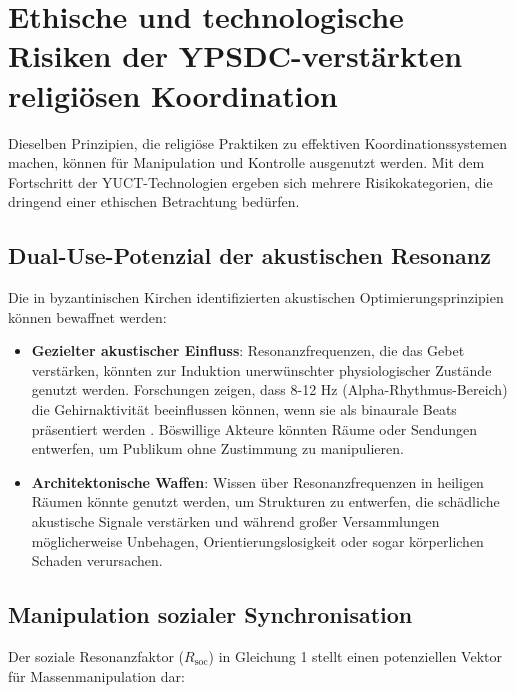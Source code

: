 \documentclass[12pt,a4paper]{article}
\begin{document}
	\section{Ethische und technologische Risiken der YPSDC-verstärkten religiösen Koordination}
	\label{sec:risks}
	
	Dieselben Prinzipien, die religiöse Praktiken zu effektiven Koordinationssystemen machen, können für Manipulation und Kontrolle ausgenutzt werden. Mit dem Fortschritt der YUCT-Technologien ergeben sich mehrere Risikokategorien, die dringend einer ethischen Betrachtung bedürfen.
	
	\subsection{Dual-Use-Potenzial der akustischen Resonanz}
	
	Die in byzantinischen Kirchen identifizierten akustischen Optimierungsprinzipien können bewaffnet werden:
	
	\begin{itemize}
		\item \textbf{Gezielter akustischer Einfluss}: Resonanzfrequenzen, die das Gebet verstärken, könnten zur Induktion unerwünschter physiologischer Zustände genutzt werden. Forschungen zeigen, dass 8-12 Hz (Alpha-Rhythmus-Bereich) die Gehirnaktivität beeinflussen können, wenn sie als binaurale Beats präsentiert werden \cite{Garcia2021}. Böswillige Akteure könnten Räume oder Sendungen entwerfen, um Publikum ohne Zustimmung zu manipulieren.
		
		\item \textbf{Architektonische Waffen}: Wissen über Resonanzfrequenzen in heiligen Räumen könnte genutzt werden, um Strukturen zu entwerfen, die schädliche akustische Signale verstärken und während großer Versammlungen möglicherweise Unbehagen, Orientierungslosigkeit oder sogar körperlichen Schaden verursachen.
	\end{itemize}
	
	\subsection{Manipulation sozialer Synchronisation}
	
	Der soziale Resonanzfaktor ($R_{\mathrm{soc}}$) in Gleichung 1 stellt einen potenziellen Vektor für Massenmanipulation dar:
	
\end{document}
